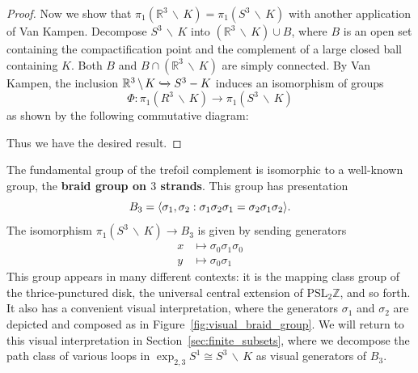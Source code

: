 \documentclass[12pt,twoside]{reedthesis}
\theoremstyle{definition}
\newcommand{\Z}{\mathbb{Z}}
\newcommand{\R}{\mathbb{R}}
\newcommand{\PSLZ}{\mathrm{PSL}_2{\Z}}
\newcommand{\into}{\xhookrightarrow{}}
\newcommand{\wo}{\, \backslash \,}
\newcommand{\defnphrase}[1]{\textbf{#1}}
\DeclarePairedDelimiter\ang{\langle}{\rangle}
\begin{document}
\begin{proof}
  Now we show that $\pi_1(\R^3 \wo K) = \pi_1(S^3 \wo K)$ with another application of Van Kampen.
  Decompose $S^3 \wo K$ into $(\R^3 \wo K) \cup B$, where $B$ is an open set containing the compactification point and the complement of a large closed ball containing $K$.
  Both $B$ and $B \cap (\R^3 \wo K)$ are simply connected.
  By Van Kampen, the inclusion $\R^3 \wo K \into S^3 - K$ induces an isomorphism of groups
  \begin{equation*}
    \Phi : \pi_1(R^3 \wo K) \to \pi_1(S^3 \wo K)
  \end{equation*}
  as shown by the following commutative diagram:
  \begin{center}
  \end{center}
  Thus we have the desired result.
\end{proof}

The fundamental group of the trefoil complement is isomorphic to a well-known group, the \defnphrase{braid group on $3$ strands}.
This group has presentation
\begin{equation*}
  B_3 = \ang{\sigma_1, \sigma_2 : \sigma_1 \sigma_2 \sigma_1 = \sigma_2 \sigma_1 \sigma_2}.
\end{equation*}
The isomorphism $\pi_1(S^3 \wo K) \to B_3$ is given by sending generators
\begin{equation}\label{eq:iso_pi1_b3}
  \begin{aligned}
    x &\mapsto \sigma_0 \sigma_1 \sigma_0 \\
    y &\mapsto \sigma_0 \sigma_1
  \end{aligned}
\end{equation}
This group appears in many different contexts: it is the mapping class group of the thrice-punctured disk, the universal central extension of $\PSLZ$, and so forth.
It also has a convenient visual interpretation, where the generators $\sigma_1$ and $\sigma_2$ are depicted and composed as in Figure~\ref{fig:visual_braid_group}.
We will return to this visual interpretation in Section~\ref{sec:finite_subsets}, where we decompose the path class of various loops in $\exp_{2,3} S^1 \cong S^3 \wo K$ as visual generators of $B_3$. 
\end{document}
